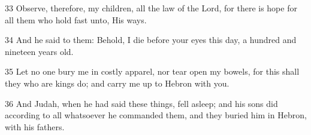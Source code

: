 \par 33 Observe, therefore, my children, all the law of the Lord, for there is hope for all them who hold fast unto, His ways.

\par 34 And he said to them: Behold, I die before your eyes this day, a hundred and nineteen years old.

\par 35 Let no one bury me in costly apparel, nor tear open my bowels, for this shall they who are kings do; and carry me up to Hebron with you.

\par 36 And Judah, when he had said these things, fell asleep; and his sons did according to all whatsoever he commanded them, and they buried him in Hebron, with his fathers.


